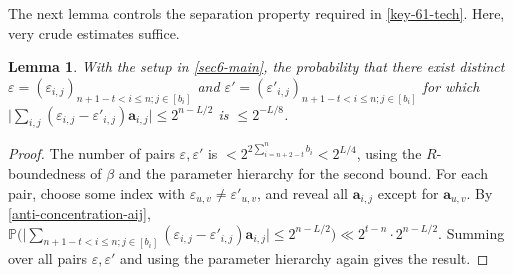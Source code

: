 \documentclass[11pt,reqno]{amsart}
\numberwithin{equation}{section}
\newtheorem{lemma}[theorem]{Lemma}
\theoremstyle{definition}
\theoremstyle{remark}
\newcommand{\mb}{\mathbb}
\newcommand{\mbf}{\mathbf}
\newcommand{\eps}{\varepsilon}
\renewcommand{\le}{\leqslant}
\begin{document}
The next lemma controls the separation property required in \cref{key-61-tech}. Here, very crude estimates suffice.

\begin{lemma}\label{7lem-claim-2} With the setup in \cref{sec6-main}, the probability that there exist distinct $\eps = (\eps_{i,j})_{n +1 - t < i \le n;j \in [b_i]}$ and $\eps' = (\eps'_{i,j})_{n +1 - t < i \le n;j \in [b_i]}$ for which $\big| \sum_{i,j} (\eps_{i,j}  - \eps'_{i,j}) \mbf{a}_{i,j}\big| \le 2^{n - L/2}$ is $\le 2^{-L/8}$.
\end{lemma}
\begin{proof}
The number of pairs $\eps, \eps'$ is $< 2^{2\sum_{i = n + 2 - t}^n b_i} < 2^{L/4}$, using the $R$-boundedness of $\beta$ and the parameter hierarchy for the second bound. For each pair, choose some index with $\eps_{u,v} \neq \eps'_{u,v}$, and reveal all $\mbf{a}_{i,j}$ except for $\mbf{a}_{u,v}$. By \cref{anti-concentration-aij}, $\mb{P} \big( \big| \sum_{n +1 - t < i \le n;j \in [b_i]} (\eps_{i,j}  - \eps'_{i,j}) \mbf{a}_{i,j}\big| \le  2^{n - L/2} \big) \ll 2^{t - n} \cdot 2^{n - L/2}$. Summing over all pairs $\eps, \eps'$ and using the parameter hierarchy again gives the result.
\end{proof}
\end{document}
